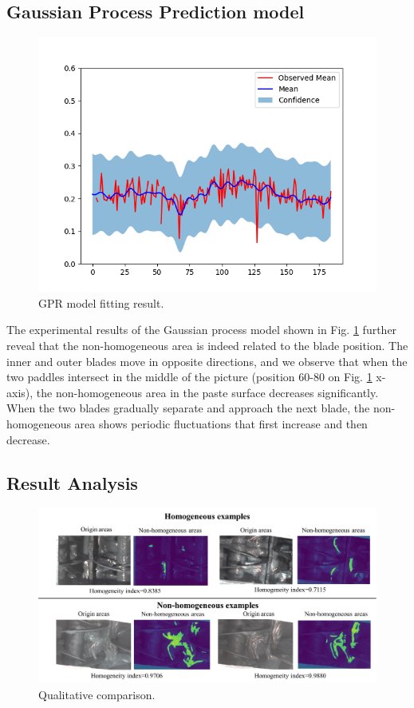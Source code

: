 \documentclass[pdflatex,sn-mathphys]{sn-jnl}%
\theoremstyle{thmstyleone}%
\theoremstyle{thmstyletwo}%
\theoremstyle{thmstylethree}%
\begin{document}
\subsection{Gaussian Process Prediction model}
\begin{figure}
    \centering
    \includegraphics[width=0.99\linewidth]{images/GP_result.png}
    \caption{GPR model fitting result.}
    \label{fig:gpr}
\end{figure}

The experimental results of the Gaussian process model shown in Fig. \ref{fig:gpr} further reveal that the non-homogeneous area is indeed related to the blade position. The inner and outer blades move in opposite directions, and we observe that when the two paddles intersect in the middle of the picture (position 60-80 on Fig. \ref{fig:gpr} x-axis), the non-homogeneous area in the paste surface decreases significantly. 
When the two blades gradually separate and approach the next blade, the non-homogeneous area shows periodic fluctuations that first increase and then decrease.


\subsection{Result Analysis}
\begin{figure}
    \centering
    \includegraphics[width=0.98\linewidth]{images/qualitative_demonstration.PNG}
    \caption{Qualitative comparison.}
    \label{fig:qualitative_comparison}
\end{figure}
\end{document}
